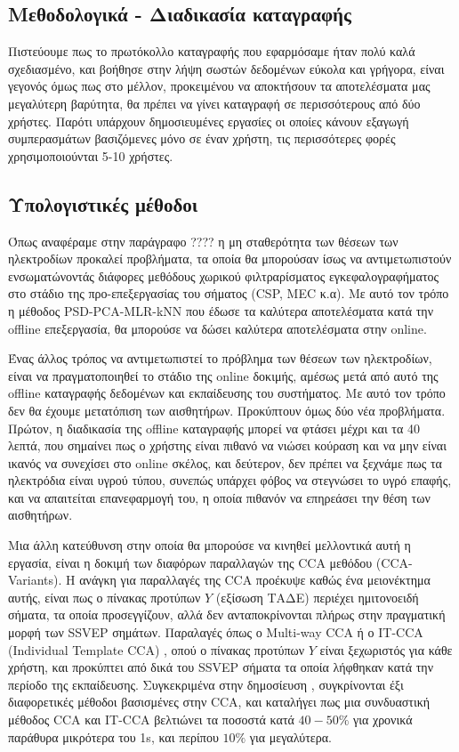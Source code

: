 \documentclass[11pt,a4paper,english,greek,twoside]{../Thesis}
\begin{document}
\subsection{Μεθοδολογικά - Διαδικασία καταγραφής}
Πιστεύουμε πως το πρωτόκολλο καταγραφής που εφαρμόσαμε ήταν πολύ καλά σχεδιασμένο, και βοήθησε στην λήψη σωστών δεδομένων εύκολα και γρήγορα, είναι γεγονός όμως πως στο μέλλον, προκειμένου να αποκτήσουν τα αποτελέσματα μας μεγαλύτερη βαρύτητα, θα πρέπει να γίνει καταγραφή σε περισσότερους από δύο χρήστες. Παρότι υπάρχουν δημοσιευμένες εργασίες οι οποίες κάνουν εξαγωγή συμπερασμάτων βασιζόμενες μόνο σε έναν χρήστη, τις περισσότερες φορές χρησιμοποιούνται 5-10 χρήστες.

\subsection{Υπολογιστικές μέθοδοι}
Όπως αναφέραμε στην παράγραφο ???? η μη σταθερότητα των θέσεων των ηλεκτροδίων προκαλεί προβλήματα, τα οποία θα μπορούσαν ίσως να αντιμετωπιστούν ενσωματώνοντάς διάφορες μεθόδους χωρικού φιλτραρίσματος εγκεφαλογραφήματος στο στάδιο της προ-επεξεργασίας του σήματος (CSP, MEC κ.α). Με αυτό τον τρόπο η μέθοδος PSD-PCA-MLR-kNN που έδωσε τα καλύτερα αποτελέσματα κατά την offline επεξεργασία, θα μπορούσε να δώσει καλύτερα αποτελέσματα στην online.

\par Ένας άλλος τρόπος να αντιμετωπιστεί το πρόβλημα των θέσεων των ηλεκτροδίων, είναι να πραγματοποιηθεί το στάδιο της online δοκιμής, αμέσως μετά από αυτό της offline καταγραφής δεδομένων και εκπαίδευσης του συστήματος. Με αυτό τον τρόπο δεν θα έχουμε μετατόπιση των αισθητήρων. Προκύπτουν όμως δύο νέα προβλήματα. Πρώτον, η διαδικασία της offline καταγραφής μπορεί να φτάσει μέχρι και τα 40 λεπτά, που σημαίνει πως ο χρήστης είναι πιθανό να νιώσει κούραση και να μην είναι ικανός να συνεχίσει στο online σκέλος, και δεύτερον, δεν πρέπει να ξεχνάμε πως τα ηλεκτρόδια είναι υγρού τύπου, συνεπώς υπάρχει φόβος να στεγνώσει το υγρό επαφής, και να απαιτείται επανεφαρμογή του, η οποία πιθανόν να επηρεάσει την θέση των αισθητήρων.\cite{noauthor_undated-vj}

\par Μια άλλη κατεύθυνση στην οποία θα μπορούσε να κινηθεί μελλοντικά αυτή η εργασία, είναι η δοκιμή των διαφόρων παραλλαγών της CCA μεθόδου (CCA-Variants). Η ανάγκη για παραλλαγές της CCA προέκυψε καθώς ένα μειονέκτημα αυτής, είναι πως ο πίνακας προτύπων $Y$ (εξίσωση ΤΑΔΕ) περιέχει ημιτονοειδή σήματα, τα οποία προσεγγίζουν, αλλά δεν ανταποκρίνονται πλήρως στην πραγματική μορφή των SSVEP σημάτων. Παραλαγές όπως ο Multi-way CCA \cite{Zhang2011-uf} ή ο IT-CCA (Individual Template CCA) \cite{Bin2011-eh}, οπού ο πίνακας προτύπων $Y$ είναι ξεχωριστός για κάθε χρήστη, και προκύπτει από δικά του SSVEP σήματα τα οποία λήφθηκαν κατά την περίοδο της εκπαίδευσης. Συγκεκριμένα στην δημοσίευση \cite{Nakanishi2015-md}, συγκρίνονται έξι διαφορετικές μέθοδοι βασισμένες στην CCA, και καταλήγει πως μια συνδυαστική μέθοδος CCA και IT-CCA βελτιώνει τα ποσοστά κατά $40-50\%$ για χρονικά παράθυρα μικρότερα του 1s, και περίπου $10\%$ για μεγαλύτερα. 
\end{document}
